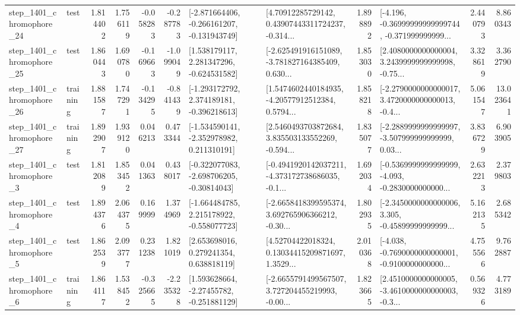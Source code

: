 \begin{tabular}{llrrrrllrlrr}
 step\_1401\_chromophore\_24 &      test &      1.814402 &    1.756119 &     -0.058283 & -0.287783 &  [-2.871664406, -0.266161207, -0.131943749] &  [4.70912285729142, 0.43907443311724237, -0.314... &       1.898892 &  [-4.196, -0.36999999999999744, -0.371999999999... &            2.440793 &          8.860343 \\
 step\_1401\_chromophore\_25 &      test &      1.860443 &    1.690780 &     -0.169663 & -1.099049 &    [1.538179117, 2.281347296, -0.624531582] &  [-2.625491916151089, -3.781827164385409, 0.630... &       1.853030 &  [2.4080000000000004, 3.2439999999999998, -0.75... &            3.328619 &          3.362790 \\
 step\_1401\_chromophore\_26 &  training &      1.881587 &    1.747291 &     -0.134295 & -0.841439 &   [-1.293172792, 2.374189181, -0.396218613] &  [1.5474602440184935, -4.20577912512384, 0.5794... &       1.858218 &  [-2.2790000000000017, 3.4720000000000013, -0.4... &            5.061547 &         13.023641 \\
 step\_1401\_chromophore\_27 &  training &      1.892907 &    1.939120 &      0.046213 &  0.473344 &   [-1.534590141, -2.352978982, 0.211310191] &  [2.5460493703872684, 3.835503133552269, -0.594... &       1.835077 &  [-2.2889999999999997, -3.507999999999999, 0.03... &            3.836729 &          6.903905 \\
  step\_1401\_chromophore\_3 &      test &      1.812089 &    1.853452 &      0.041363 &  0.438017 &   [-0.322077083, -2.698706205, -0.30814043] &  [-0.4941920142037211, -4.373172738686035, -0.1... &       1.692034 &  [-0.5369999999999999, -4.093, -0.2830000000000... &            2.632213 &          2.379803 \\
  step\_1401\_chromophore\_4 &      test &      1.894376 &    2.064375 &      0.169999 &  1.374969 &   [-1.664484785, 2.215178922, -0.558077723] &  [-2.6658418399595374, 3.692765906366212, -0.30... &       1.802935 &  [-2.3450000000000006, 3.305, -0.45899999999999... &            5.162135 &          2.685342 \\
  step\_1401\_chromophore\_5 &      test &      1.862539 &    2.093777 &      0.231238 &  1.821019 &     [2.653698016, 0.279241354, 0.638818119] &  [4.52704422018324, 0.13034415209871697, 1.3529... &       2.010368 &  [-4.038, -0.7690000000000001, -0.9100000000000... &            4.755566 &          9.762887 \\
  step\_1401\_chromophore\_6 &  training &      1.864117 &    1.538452 &     -0.325665 & -2.235328 &    [1.593628664, -2.27455782, -0.251881129] &  [-2.6655791499567507, 3.727204455219993, -0.00... &       1.823665 &  [2.4510000000000005, -3.4610000000000003, -0.3... &            0.569326 &          4.773189 \\

\end{tabular}

